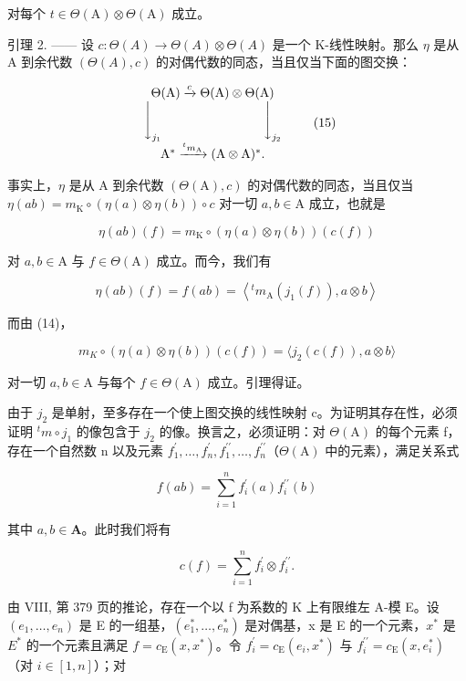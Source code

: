 对每个 \(t\in \Theta (\mathrm{A})\otimes \Theta (\mathrm{A})\) 成立。

引理 2. —— 设 \(c: \Theta(A) \to \Theta(A) \otimes \Theta(A)\) 是一个 K-线性映射。那么 \(\eta\) 是从 A 到余代数 \((\Theta(A), c)\) 的对偶代数的同态，当且仅当下面的图交换：

\[
\begin{array}{c} \Theta (\mathrm{A}) \xrightarrow {c} \Theta (\mathrm{A}) \otimes \Theta (\mathrm{A}) \\ \Biggl \downarrow_ {j _ {1}} \qquad \qquad \qquad \qquad \Biggl \downarrow_ {j _ {2}} \\ \mathrm{A} ^ {*} \xrightarrow {^ t m _ {\mathrm{A}}} (\mathrm{A} \otimes \mathrm{A}) ^ {*}. \end{array}\tag{15}
\]

事实上，\(\eta\) 是从 A 到余代数 \((\Theta (\mathrm{A}),c)\) 的对偶代数的同态，当且仅当 \(\eta (ab) = m_{\mathrm{K}}\circ (\eta (a)\otimes \eta (b))\circ c\) 对一切 \(a,b\in \mathrm{A}\) 成立，也就是

\[
\eta (a b) (f) = m _ {\mathrm{K}} \circ (\eta (a) \otimes \eta (b)) (c (f))
\]

对 \(a, b \in \mathrm{A}\) 与 \(f \in \Theta(\mathrm{A})\) 成立。而今，我们有

\[
\eta (a b) (f) = f (a b) = \left\langle {} ^ {t} m _ {\mathrm{A}} \left(j _ {1} (f)\right), a \otimes b \right\rangle
\]

而由 (14)，

\[
m _ {K} \circ (\eta (a) \otimes \eta (b)) (c (f)) = \langle j _ {2} (c (f)), a \otimes b \rangle
\]

对一切 \(a, b \in \mathrm{A}\) 与每个 \(f \in \Theta(\mathrm{A})\) 成立。引理得证。

由于 \(j_{2}\) 是单射，至多存在一个使上图交换的线性映射 c。为证明其存在性，必须证明 \(^{t}m \circ j_{1}\) 的像包含于 \(j_{2}\) 的像。换言之，必须证明：对 \(\Theta(\mathrm{A})\) 的每个元素 f，存在一个自然数 n 以及元素 \(f_{1}^{\prime}, \ldots, f_{n}^{\prime}, f_{1}^{\prime\prime}, \ldots, f_{n}^{\prime\prime}\)（\(\Theta(\mathrm{A})\) 中的元素），满足关系式

\[
f (a b) = \sum_ {i = 1} ^ {n} f _ {i} ^ {\prime} (a) f _ {i} ^ {\prime \prime} (b)\tag{16}
\]

其中 \(a, b \in \mathbf{A}\)。此时我们将有

\[
c (f) = \sum_ {i = 1} ^ {n} f _ {i} ^ {\prime} \otimes f _ {i} ^ {\prime \prime}.\tag{17}
\]

由 VIII, 第 379 页的推论，存在一个以 f 为系数的 K 上有限维左 A-模 E。设 \((e_{1},\ldots,e_{n})\) 是 E 的一组基，\((e_{1}^{*},\ldots,e_{n}^{*})\) 是对偶基，x 是 E 的一个元素，\(x^{*}\) 是 \(E^{*}\) 的一个元素且满足 \(f=c_{\mathrm{E}}(x,x^{*})\)。令 \(f_{i}^{\prime}=c_{\mathrm{E}}(e_{i},x^{*})\) 与 \(f_{i}^{\prime\prime}=c_{\mathrm{E}}(x,e_{i}^{*})\)（对 \(i\in[1,n]\)）；对


